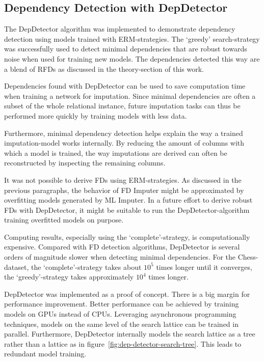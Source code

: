 \subsection{Dependency Detection with DepDetector}
The DepDetector algorithm was implemented to demonstrate dependency detection using models trained with ERM-strategies.
The `greedy' search-strategy was successfully used to detect minimal dependencies that are robust towards noise when used for training new models.
The dependencies detected this way are a blend of RFDs as discussed in the theory-section of this work.

Dependencies found with DepDetector can be used to save computation time when training a network for imputation.
Since minimal dependencies are often a subset of the whole relational instance, future imputation tasks can thus be performed more quickly by training models with less data.

Furthermore, minimal dependency detection helps explain the way a trained imputation-model works internally.
By reducing the amount of columns with which a model is trained, the way imputations are derived can often be reconstructed by inspecting the remaining columns.

It was not possible to derive FDs using ERM-strategies.
As discussed in the previous paragraphs, the behavior of FD Imputer might be approximated by overfitting models generated by ML Imputer.
In a future effort to derive robust FDs with DepDetector, it might be suitable to run the DepDetector-algorithm training overfitted models on purpose.

Computing results, especially using the `complete'-strategy, is computationally expensive.
Compared with FD detection algorithms, DepDetector is several orders of magnitude slower when detecting minimal dependencies.
For the Chess-dataset, the `complete'-strategy takes about \( 10^5 \) times longer until it converges, the `greedy'-strategy takes approximately \( 10^4 \) times longer.

DepDetector was implemented as a proof of concept.
There is a big margin for performance improvement.
Better performance can be achieved by training models on GPUs instead of CPUs.
Leveraging asynchronous programming techniques, models on the same level of the search lattice can be trained in parallel.
Furthermore, DepDetector internally models the search lattice as a tree rather than a lattice as in figure~\ref{fig:dep-detector-search-tree}.
This leads to redundant model training.


